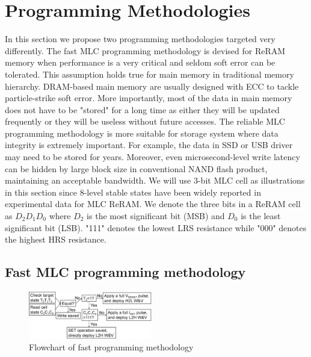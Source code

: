 \section{Programming Methodologies} \label{sec:programming}

In this section we propose two programming methodologies targeted very differently. The fast MLC programming methodology is devised for ReRAM memory when performance is a very critical and seldom soft error can be tolerated. This assumption holds true for main memory in traditional memory hierarchy. DRAM-based main memory are usually designed with ECC to tackle particle-strike soft error. More importantly, most of the data in main memory does not have to be "stored" for a long time as either they will be updated frequently or they will be useless without future accesses. The reliable MLC programming methodology is more suitable for storage system where data integrity is extremely important. For example, the data in SSD or USB driver may need to be stored for years. Moreover, even microsecond-level write latency can be hidden by large block size in conventional NAND flash product, maintaining an acceptable bandwidth. We will use 3-bit MLC cell as illustrations in this section since 8-level stable states have been widely reported in experimental data for MLC ReRAM. We denote the three bits in a ReRAM cell as $D_2D_1D_0$ where $D_2$ is the most significant bit (MSB) and $D_0$ is the least significant bit (LSB). "111" denotes the lowest LRS resistance while "000" denotes the highest HRS resistance.

\subsection{Fast MLC programming methodology}

\begin{figure}[t]
\centering
\includegraphics[width=0.48\textwidth]{fig/fastprog}
\vspace{-10pt}
\caption{Flowchart of fast programming methodology}
\label{fig:fastprog}
\vspace{-15pt}
\end{figure}

